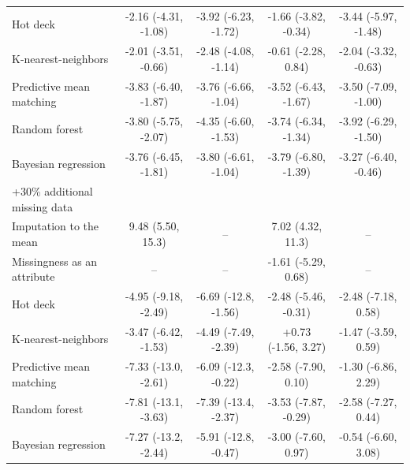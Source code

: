 \documentclass{article}
\begin{document}
\begin{table}
\begin{tabular}{lcccc}
Hot deck & -2.16 (-4.31, -1.08) & -3.92 (-6.23, -1.72) & -1.66 (-3.82, -0.34) & -3.44 (-5.97, -1.48) \\ 
K-nearest-neighbors & -2.01 (-3.51, -0.66) & -2.48 (-4.08, -1.14) & -0.61 (-2.28, 0.84) & -2.04 (-3.32, -0.63) \\ 
Predictive mean matching & -3.83 (-6.40, -1.87) & -3.76 (-6.66, -1.04) & -3.52 (-6.43, -1.67) & -3.50 (-7.09, -1.00) \\ 
Random forest & -3.80 (-5.75, -2.07) & -4.35 (-6.60, -1.53) & -3.74 (-6.34, -1.34) & -3.92 (-6.29, -1.50) \\ 
Bayesian regression & -3.76 (-6.45, -1.81) & -3.80 (-6.61, -1.04) & -3.79 (-6.80, -1.39) & -3.27 (-6.40, -0.46) \\ 
\midrule
\multicolumn{1}{l}{+30\% additional missing data} \\ 
\midrule
Imputation to the mean & 9.48 (5.50, 15.3) & -- & 7.02 (4.32, 11.3) & -- \\ 
Missingness as an attribute & -- & -- & -1.61 (-5.29, 0.68) & -- \\ 
Hot deck & -4.95 (-9.18, -2.49) & -6.69 (-12.8, -1.56) & -2.48 (-5.46, -0.31) & -2.48 (-7.18, 0.58) \\ 
K-nearest-neighbors & -3.47 (-6.42, -1.53) & -4.49 (-7.49, -2.39) & +0.73 (-1.56, 3.27) & -1.47 (-3.59, 0.59) \\ 
Predictive mean matching & -7.33 (-13.0, -2.61) & -6.09 (-12.3, -0.22) & -2.58 (-7.90, 0.10) & -1.30 (-6.86, 2.29) \\ 
Random forest & -7.81 (-13.1, -3.63) & -7.39 (-13.4, -2.37) & -3.53 (-7.87, -0.29) & -2.58 (-7.27, 0.44) \\ 
Bayesian regression & -7.27 (-13.2, -2.44) & -5.91 (-12.8, -0.47) & -3.00 (-7.60, 0.97) & -0.54 (-6.60, 3.08) \\ 
\bottomrule
\end{tabular} 
 \end{table}

\clearpage
\end{document}
